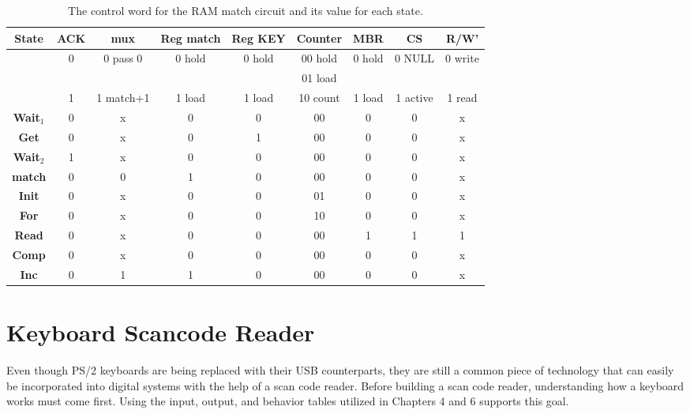 \begin{table}
{\tiny
\begin{tabular}{c||c|c|c|c|c|c|c|c}  
\textbf{ State }  & ACK   & mux       &  Reg match& Reg KEY & Counter     & MBR    & CS       & R/W'    \\ \hline
        & 0     & 0 pass 0  &  0 hold   & 0 hold  & 00 hold     & 0 hold & 0 NULL   & 0 write \\ \hline
        &       &           &           &         & 01 load     &        &          &         \\ \hline
        & 1     & 1 match+1 &  1 load   & 1 load  & 10 count    & 1 load & 1 active & 1 read  \\ \hline \hline
\textbf{ Wait$_1$ }  & 0     & x         & 0         & 0       & 00          & 0      & 0        & x       \\ \hline
\textbf{ Get   }  & 0     & x         & 0         & 1       & 00          & 0      & 0        & x       \\ \hline
\textbf{ Wait$_2$ }  & 1     & x         & 0         & 0       & 00          & 0      & 0        & x       \\ \hline
\textbf{ match }   & 0     & 0         & 1         & 0       & 00          & 0      & 0        & x       \\ \hline
\textbf{ Init }   & 0     & x         & 0         & 0       & 01          & 0      & 0        & x       \\ \hline
\textbf{ For  }   & 0     & x         & 0         & 0       & 10          & 0      & 0        & x       \\ \hline
\textbf{ Read }   & 0     & x         & 0         & 0       & 00          & 1      & 1        & 1       \\ \hline
\textbf{ Comp }   & 0     & x         & 0         & 0       & 00          & 0      & 0        & x       \\ \hline
\textbf{ Inc }    & 0     & 1         & 1         & 0       & 00          & 0      & 0        & x       \\ 
\end{tabular}
}
\caption{The control word for the RAM match circuit and its value for each state.}
\label{table:RAMmatch}
\end{table}



\section{Keyboard Scancode Reader}
Even though PS/2 keyboards are being replaced with their USB counterparts,
they are still a common piece of technology that can easily be incorporated 
into digital systems with the help of a scan code reader.  Before building
a scan code reader, understanding how a keyboard works must come first.
Using the input, output, and behavior tables utilized
in Chapters 4 and 6 supports this goal.

